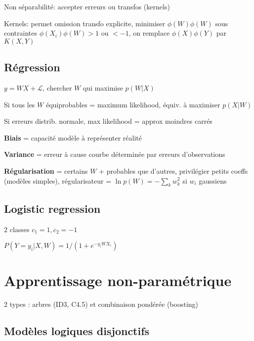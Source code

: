 Non séparabilité: accepter erreurs ou transfos (kernels)

Kernels: permet omission transfo explicite, minimiser $\phi(W)\phi(W)$ sous contraintes $\phi(X_i)\phi(W)>1$ ou $<-1$, on remplace $\phi(X)\phi(Y)$ par $K(X,Y)$

\subsection*{Régression}

$y=WX + \mathcal{L}$, chercher $W$ qui maximise $p(W|X)$

Si tous les $W$ équiprobables = maximum likelihood, équiv. à maximiser $p(X|W)$

Si erreurs distrib. normale, max likelihood = approx moindres carrés

\textbf{Biais} = capacité modèle à représenter réalité

\textbf{Variance} = erreur à cause courbe déterminée par erreurs d'observations

\textbf{Régularisation} = certains $W$ + probables que d'autres, privilégier petits coeffs (modèles simples), régularisateur = $\ln p(W) = - \sum_k w_k^2$ si $w_i$ gaussiens

\subsection*{Logistic regression}

2 classes $c_1=1, c_2=-1$

$P(Y=y_i|X,W) = 1/(1+e^{-y_iWX_i})$


\section*{Apprentissage non-paramétrique}


2 types : arbres (ID3, C4.5) et combinaison pondérée (boosting)

\subsection*{Modèles logiques disjonctifs}


